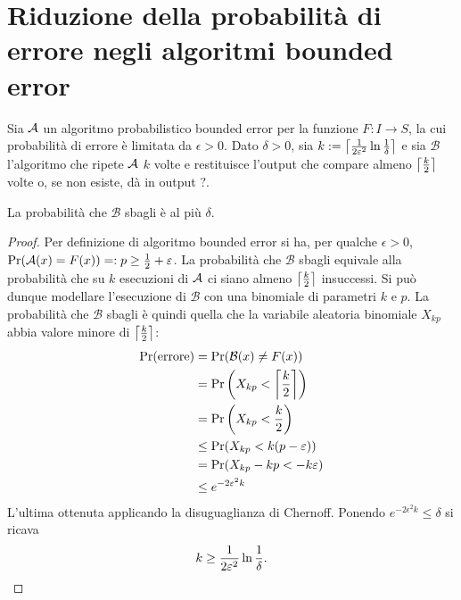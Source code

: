 \section{Riduzione della probabilità di errore negli algoritmi bounded error}
\newcommand{\Balg}{\mathcal B}

Sia $\Aalg$ un algoritmo probabilistico bounded error per la funzione $F:I\to S$, la cui probabilità di errore è limitata da $\epsilon>0$.
Dato $\delta>0$, sia $k:=\ceil{\frac{1}{2\epsilon^2}\ln\frac{1}{\delta}}$ e sia $\Balg$ l'algoritmo che ripete $\Aalg$ $k$ volte e restituisce l'output che compare almeno $\ceil{\frac k2}$ volte o, se non esiste, dà in output $?$.

\begin{thm}
	La probabilità che $\Balg$ sbagli è al più $\delta$.
\end{thm}
\begin{proof}
	Per definizione di algoritmo bounded error si ha, per qualche $\epsilon>0$, $\Pr(\Aalg(x)=F(x))=:p\ge\frac 12+\epsilon$.
	La probabilità che $\Balg$ sbagli equivale alla probabilità che su $k$ esecuzioni di $\Aalg$ ci siano almeno $\ceil{\frac k2}$ insuccessi.
	Si può dunque modellare l'esecuzione di $\Balg$ con una binomiale di parametri $k$ e $p$. La probabilità che $\Balg$ sbagli è quindi quella che la variabile aleatoria binomiale $X_{kp}$ abbia valore minore di $\ceil{\frac k2}$:
	\begin{align*}
		\Pr(\text{errore}) & = \Pr(\Balg(x)\ne F(x))                  \\
		                   & = \Pr\left(X_{kp}<\ceil{\frac k2}\right) \\
		                   & = \Pr\left(X_{kp}<\frac k2\right)        \\
		                   & \le \Pr(X_{kp}<k(p-\epsilon))            \\
		                   & = \Pr(X_{kp}-kp<-k\epsilon)              \\
		                   & \le e^{-2\epsilon^2 k}
	\end{align*}
	L'ultima ottenuta applicando la disuguaglianza di Chernoff. Ponendo $e^{-2\epsilon^2 k}\le\delta$ si ricava
	\begin{equation*}
		k\ge\frac{1}{2\epsilon^2}\ln\frac{1}{\delta} \text. \qedhere
	\end{equation*}
\end{proof}
